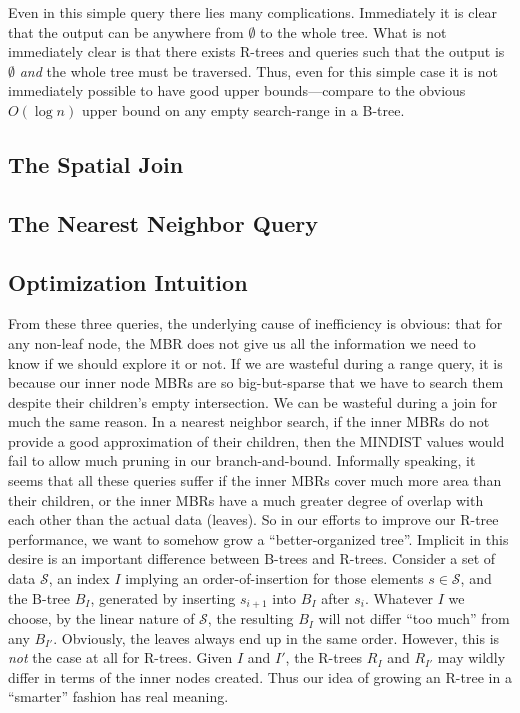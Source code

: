 Even in this simple query there lies many complications.
Immediately it is clear that the output can be anywhere from $\emptyset$ to the whole tree.
What is not immediately clear is that there exists R-trees and queries such that the output is $\emptyset$ \emph{and} the whole tree must be traversed.
Thus, even for this simple case it is not immediately possible to have good upper bounds---compare to the obvious $O(\log n)$ upper bound on any empty search-range in a B-tree.
\subsection{The Spatial Join}
\subsection{The Nearest Neighbor Query}
\subsection{Optimization Intuition}
From these three queries, the underlying cause of inefficiency is obvious: that for any non-leaf node, the MBR does not give us all the information we need to know if we should explore it or not.
If we are wasteful during a range query, it is because our inner node MBRs are so big-but-sparse that we have to search them despite their children's empty intersection.
We can be wasteful during a join for much the same reason.
In a nearest neighbor search, if the inner MBRs do not provide a good approximation of their children, then the MINDIST values would fail to allow much pruning in our branch-and-bound.
Informally speaking, it seems that all these queries suffer if the inner MBRs cover much more area than their children, or the inner MBRs have a much greater degree of overlap with each other than the actual data (leaves).
So in our efforts to improve our R-tree performance, we want to somehow grow a ``better-organized tree''.
Implicit in this desire is an important difference between B-trees and R-trees.
Consider a set of data $\mathcal S$, an index $I$ implying an order-of-insertion for those elements $s\in \mathcal S$, and the B-tree $B_I$, generated by inserting $s_{i+1}$ into $B_I$ after $s_{i}$.
Whatever $I$ we choose, by the linear nature of $\mathcal S$, the resulting $B_I$ will not differ ``too much'' from any $B_{I\prime}$.
Obviously, the leaves always end up in the same order.
However, this is \emph{not} the case at all for R-trees.
Given $I$ and $I\prime$, the R-trees $R_I$ and $R_{I\prime}$ may wildly differ in terms of the inner nodes created.
Thus our idea of growing an R-tree in a ``smarter'' fashion has real meaning.

